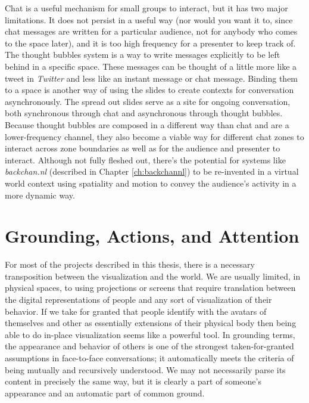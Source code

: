 Chat is a useful mechanism for small groups to interact, but it has two major limitations. It does not persist in a useful way (nor would you want it to, since chat messages are written for a particular audience, not for anybody who comes to the space later), and it is too high frequency for a presenter to keep track of. The thought bubbles system is a way to write messages explicitly to be left behind in a specific space. These messages can be thought of a little more like a tweet in \emph{Twitter} and less like an instant message or chat message. Binding them to a space is another way of using the slides to create contexts for conversation asynchronously. The spread out slides serve as a site for ongoing conversation, both synchronous through chat and asynchronous through thought bubbles. Because thought bubbles are composed in a different way than chat and are a lower-frequency channel, they also become a viable way for different chat zones to interact across zone boundaries as well as for the audience and presenter to interact. Although not fully fleshed out, there's the potential for systems like \emph{backchan.nl} (described in Chapter \ref{ch:backchannl}) to be re-invented in a virtual world context using spatiality and motion to convey the audience's activity in a more dynamic way.


\section{Grounding, Actions, and Attention}


For most of the projects described in this thesis, there is a necessary transposition between the visualization and the world. We are usually limited, in physical spaces, to using projections or screens that require translation between the digital representations of people and any sort of visualization of their behavior. If we take for granted that people identify with the avatars of themselves and other as essentially extensions of their physical body  then being able to do in-place visualization seems like a powerful tool. In grounding terms, the appearance and behavior of others is one of the strongest taken-for-granted assumptions in face-to-face conversations; it automatically meets the criteria of being mutually and recursively understood. We may not necessarily parse its content in precisely the same way, but it is clearly a part of someone's appearance and an automatic part of common ground. 


